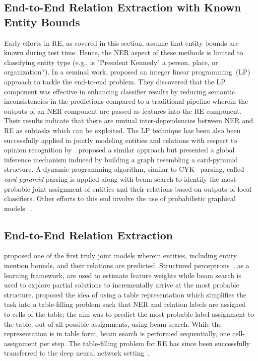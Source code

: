 \documentclass{clv3}
\newcommand{\ere}{RE}
\begin{document}
\subsection{End-to-End Relation Extraction with Known Entity Bounds}
Early efforts in \ere{}, as covered in this section, assume that entity bounds are known during test time. Hence, the NER aspect of these methods is limited to classifying entity type (e.g., is "President Kennedy" a person, place, or organization?). In a seminal work,  proposed an integer linear programming~(LP) approach to tackle the end-to-end   problem. They discovered that the LP component was effective in enhancing classifier results by reducing semantic inconsistencies in the predictions compared to a traditional pipeline   wherein the outputs of an NER component are passed as features into the RE component. Their results indicate that there are mutual inter-dependencies between NER and RE as subtasks which can be exploited. The LP technique has been also been successfully applied in jointly modeling entities and relations with respect to opinion recognition by  .  proposed a similar approach but presented a global inference mechanism induced by building a graph resembling a card-pyramid structure. A dynamic programming algorithm, similar to CYK~\cite{jurafsky2008speech} parsing, called \emph{card-pyramid} parsing is applied along with beam search to identify the most probable joint assignment of entities and their relations based on outputs of local classifiers. Other efforts to this end involve the use of probabilistic graphical models~ \cite{yu2010jointly,singh2013joint}. 

\subsection{End-to-End Relation Extraction}
 proposed one of  the first truly joint models wherein entities, including entity mention bounds, and their relations are predicted. Structured perceptrons~\cite{collins2002discriminative}, as a learning framework, are used to estimate feature weights while beam search is used to explore partial solutions to incrementally arrive at the most probable structure.   proposed the idea of using a table representation which simplifies the task into a table-filling problem such that NER and relation labels are assigned to cells of the table; the aim was to predict the most probable label assignment to the table, out of all possible assignments, using beam search. While the representation is in table form, beam search is performed sequentially, one cell-assignment per step. The table-filling problem for \ere{} has since been successfully transferred to the deep neural network setting~\cite{gupta2016table,pawar2017end,zhang2017end}.
\end{document}
